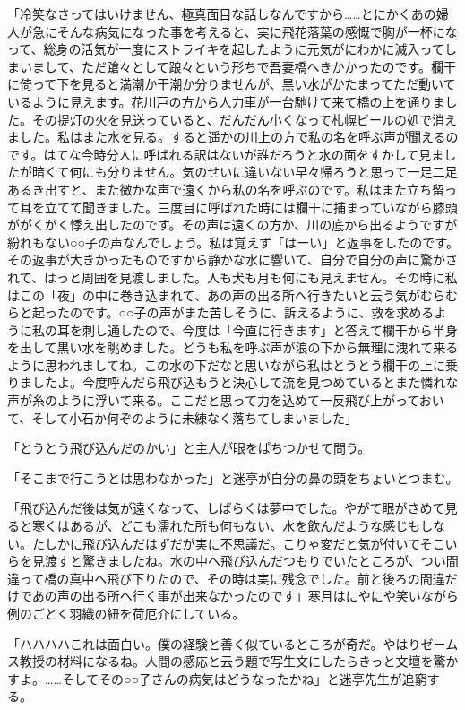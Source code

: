 \documentclass[12pt, openright]{book}
\begin{document}
「冷笑なさってはいけません、極真面目な話しなんですから\ldots{}\ldots{}とにかくあの婦人が急にそんな病気になった事を考えると、実に飛花落葉の感慨で胸が一杯になって、総身の活気が一度にストライキを起したように元気がにわかに滅入ってしまいまして、ただ蹌々として踉々という形ちで吾妻橋へきかかったのです。欄干に倚って下を見ると満潮か干潮か分りませんが、黒い水がかたまってただ動いているように見えます。花川戸の方から人力車が一台馳けて来て橋の上を通りました。その提灯の火を見送っていると、だんだん小くなって札幌ビールの処で消えました。私はまた水を見る。すると遥かの川上の方で私の名を呼ぶ声が聞えるのです。はてな今時分人に呼ばれる訳はないが誰だろうと水の面をすかして見ましたが暗くて何にも分りません。気のせいに違いない早々帰ろうと思って一足二足あるき出すと、また微かな声で遠くから私の名を呼ぶのです。私はまた立ち留って耳を立てて聞きました。三度目に呼ばれた時には欄干に捕まっていながら膝頭ががくがく悸え出したのです。その声は遠くの方か、川の底から出るようですが紛れもない○○子の声なんでしょう。私は覚えず「はーい」と返事をしたのです。その返事が大きかったものですから静かな水に響いて、自分で自分の声に驚かされて、はっと周囲を見渡しました。人も犬も月も何にも見えません。その時に私はこの「夜」の中に巻き込まれて、あの声の出る所へ行きたいと云う気がむらむらと起ったのです。○○子の声がまた苦しそうに、訴えるように、救を求めるように私の耳を刺し通したので、今度は「今直に行きます」と答えて欄干から半身を出して黒い水を眺めました。どうも私を呼ぶ声が浪の下から無理に洩れて来るように思われましてね。この水の下だなと思いながら私はとうとう欄干の上に乗りましたよ。今度呼んだら飛び込もうと決心して流を見つめているとまた憐れな声が糸のように浮いて来る。ここだと思って力を込めて一反飛び上がっておいて、そして小石か何ぞのように未練なく落ちてしまいました」

「とうとう飛び込んだのかい」と主人が眼をぱちつかせて問う。

「そこまで行こうとは思わなかった」と迷亭が自分の鼻の頭をちょいとつまむ。

「飛び込んだ後は気が遠くなって、しばらくは夢中でした。やがて眼がさめて見ると寒くはあるが、どこも濡れた所も何もない、水を飲んだような感じもしない。たしかに飛び込んだはずだが実に不思議だ。こりゃ変だと気が付いてそこいらを見渡すと驚きましたね。水の中へ飛び込んだつもりでいたところが、つい間違って橋の真中へ飛び下りたので、その時は実に残念でした。前と後ろの間違だけであの声の出る所へ行く事が出来なかったのです」寒月はにやにや笑いながら例のごとく羽織の紐を荷厄介にしている。

「ハハハハこれは面白い。僕の経験と善く似ているところが奇だ。やはりゼームス教授の材料になるね。人間の感応と云う題で写生文にしたらきっと文壇を驚かすよ。\ldots{}\ldots{}そしてその○○子さんの病気はどうなったかね」と迷亭先生が追窮する。
\end{document}
